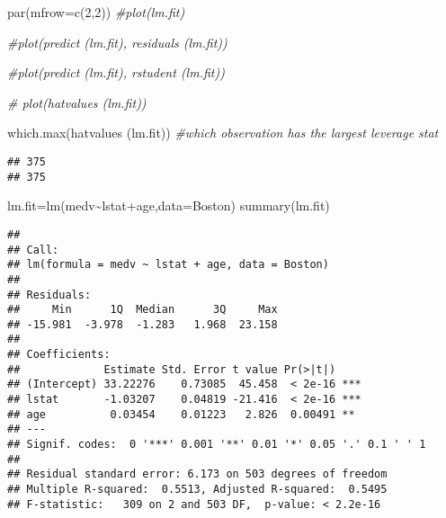 \documentclass[
]{article}
\newenvironment{Shaded}{\begin{snugshade}}{\end{snugshade}}
\newcommand{\AttributeTok}[1]{\textcolor[rgb]{0.77,0.63,0.00}{#1}}
\newcommand{\CommentTok}[1]{\textcolor[rgb]{0.56,0.35,0.01}{\textit{#1}}}
\newcommand{\DecValTok}[1]{\textcolor[rgb]{0.00,0.00,0.81}{#1}}
\newcommand{\FunctionTok}[1]{\textcolor[rgb]{0.00,0.00,0.00}{#1}}
\newcommand{\NormalTok}[1]{#1}
\newcommand{\OtherTok}[1]{\textcolor[rgb]{0.56,0.35,0.01}{#1}}
\newcommand{\SpecialCharTok}[1]{\textcolor[rgb]{0.00,0.00,0.00}{#1}}
\begin{document}
\begin{Shaded}
\begin{Highlighting}[]
\FunctionTok{par}\NormalTok{(}\AttributeTok{mfrow=}\FunctionTok{c}\NormalTok{(}\DecValTok{2}\NormalTok{,}\DecValTok{2}\NormalTok{))}
\CommentTok{\#plot(lm.fit)}
\end{Highlighting}
\end{Shaded}

\begin{Shaded}
\begin{Highlighting}[]
 \CommentTok{\#plot(predict (lm.fit), residuals (lm.fit))}
\end{Highlighting}
\end{Shaded}

\begin{Shaded}
\begin{Highlighting}[]
 \CommentTok{\#plot(predict (lm.fit), rstudent (lm.fit))}
\end{Highlighting}
\end{Shaded}

\begin{Shaded}
\begin{Highlighting}[]
\CommentTok{\# plot(hatvalues (lm.fit))}
\end{Highlighting}
\end{Shaded}

\begin{Shaded}
\begin{Highlighting}[]
 \FunctionTok{which.max}\NormalTok{(}\FunctionTok{hatvalues}\NormalTok{ (lm.fit)) }\CommentTok{\#which observation has the largest leverage stat}
\end{Highlighting}
\end{Shaded}

\begin{verbatim}
## 375 
## 375
\end{verbatim}

\begin{Shaded}
\begin{Highlighting}[]
\NormalTok{lm.fit}\OtherTok{=}\FunctionTok{lm}\NormalTok{(medv}\SpecialCharTok{\textasciitilde{}}\NormalTok{lstat}\SpecialCharTok{+}\NormalTok{age,}\AttributeTok{data=}\NormalTok{Boston)}
\FunctionTok{summary}\NormalTok{(lm.fit)}
\end{Highlighting}
\end{Shaded}

\begin{verbatim}
## 
## Call:
## lm(formula = medv ~ lstat + age, data = Boston)
## 
## Residuals:
##     Min      1Q  Median      3Q     Max 
## -15.981  -3.978  -1.283   1.968  23.158 
## 
## Coefficients:
##             Estimate Std. Error t value Pr(>|t|)    
## (Intercept) 33.22276    0.73085  45.458  < 2e-16 ***
## lstat       -1.03207    0.04819 -21.416  < 2e-16 ***
## age          0.03454    0.01223   2.826  0.00491 ** 
## ---
## Signif. codes:  0 '***' 0.001 '**' 0.01 '*' 0.05 '.' 0.1 ' ' 1
## 
## Residual standard error: 6.173 on 503 degrees of freedom
## Multiple R-squared:  0.5513, Adjusted R-squared:  0.5495 
## F-statistic:   309 on 2 and 503 DF,  p-value: < 2.2e-16
\end{verbatim}
\end{document}
